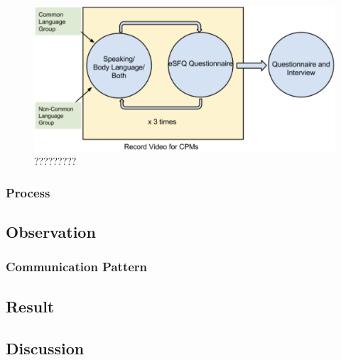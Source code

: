 \begin{figure}[!h]
\centering
\includegraphics[width=0.9\columnwidth]{Figures/US_F1.png}
\caption{?????????}
\label{fig:US1}
\end{figure}



\subsubsection{Process}

\subsection{Observation}

\subsubsection{Communication Pattern}

\subsection{Result}

\subsection{Discussion}